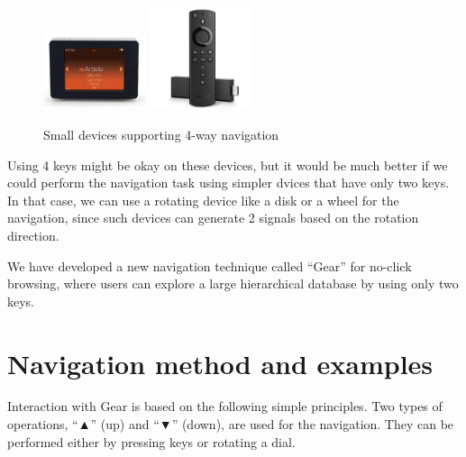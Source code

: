 \documentclass[conference]{IEEEtran}
\def\up{▲}
\def\down{▼}
\begin{document}
\begin{figure}[H]
\centerline{
  \includegraphics[width=30mm,bb=0 0 333 250]{figures/0048a5e91ddcf1d5670bd958e3c55619.jpg}
  \includegraphics[width=30mm,bb=0 0 551 551]{figures/70c036b24525c6cace9955b24152e97e.jpg}
  }
\caption{Small devices supporting 4-way navigation}
\label{rio}
\end{figure}

Using 4 keys might be okay on these devices, but it would be much better
if we could perform the navigation task using simpler dvices that have only two keys.
In that case, we can use a rotating device like a disk or a wheel for the navigation,
since such devices can generate 2 signals based on the rotation direction.

We have developed a new navigation technique called ``{Gear}'' for no-click browsing,
where users can explore a large hierarchical database by using only two keys.


\section{Navigation method and examples}
\label{navigation}

Interaction with Gear is based on the following simple principles.
Two types of operations,
``{\up}'' (up) and ``{\down}'' (down), are used for the navigation.
They can be performed either by pressing keys or rotating a dial.
\end{document}
